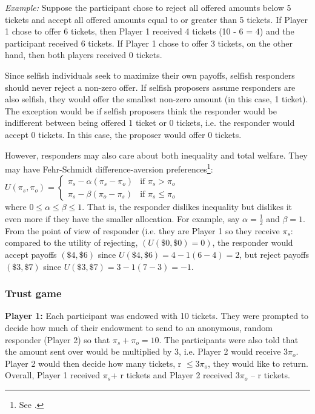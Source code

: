 \documentclass[12pt]{article}
\begin{document}
\textit{Example:} Suppose the participant chose to reject all offered amounts below 5 tickets and accept all offered amounts equal to or greater than 5 tickets. If Player 1 chose to offer 6 tickets, then Player 1 received 4 tickets (10 - 6 = 4) and the participant received 6 tickets. If Player 1 chose to offer 3 tickets, on the other hand, then both players received 0 tickets. 

Since selfish individuals seek to maximize their own payoffs, selfish responders should never reject a non-zero offer. If selfish proposers assume responders are also selfish, they would offer the smallest non-zero amount (in this case, 1 ticket). The exception would be if selfish proposers think the responder would be indifferent between being offered 1 ticket or 0 tickets, i.e. the responder would accept 0 tickets. In this case, the proposer would offer 0 tickets.


However, responders may also care about both inequality and total welfare. They may have Fehr-Schmidt difference-aversion preferences\footnote{See \cite{fehr_schmidt_1999}.}:\\

$ U(\pi_{s}, \pi_{o})  = \begin{cases}
      \pi_{s} - \alpha(\pi_{s} - \pi_{o}) & \text{if }\pi_{s} > \pi_{o} \\
      \pi_{s} - \beta(\pi_{o} - \pi_{s}) & \text{if }\pi_{s} \leq \pi_{o}
    \end{cases}\, $ \\

\noindent where $ 0 \leq \alpha \leq \beta \leq 1$. That is, the responder dislikes inequality but dislikes it even more if they have the smaller allocation. For example, say $\alpha = \frac{1}{2}$ and $\beta=1$. From the point of view of responder (i.e. they are Player 1 so they receive \(\pi_{s}\): compared to the utility of rejecting, \((U(\$0, \$0) = 0)\), the responder would accept payoffs \((\$4, \$6)\) since \(U(\$4, \$6) = 4 - 1(6 - 4) =  2\), but reject payoffs \((\$3, \$7)\) since \(U(\$3,  \$7) = 3 - 1(7 - 3) = -1\).

	
\subsubsection{Trust game}
\textbf{Player 1:} Each participant was endowed with 10 tickets. They were prompted to decide how much of their endowment to send to an anonymous, random responder (Player 2) so that \(\pi_{s} + \pi_{o} = 10\). The participants were also told that the amount sent over would be multiplied by 3, i.e. Player 2 would receive 3\(\pi_{o}\). Player 2 would then decide how many tickets, r \(\leq 3\pi_{o}\), they would like to return. Overall, Player 1 received \(\pi_{s}\)+ r tickets and Player 2 received 3\(\pi_{o}\) -- r tickets.
\end{document}
